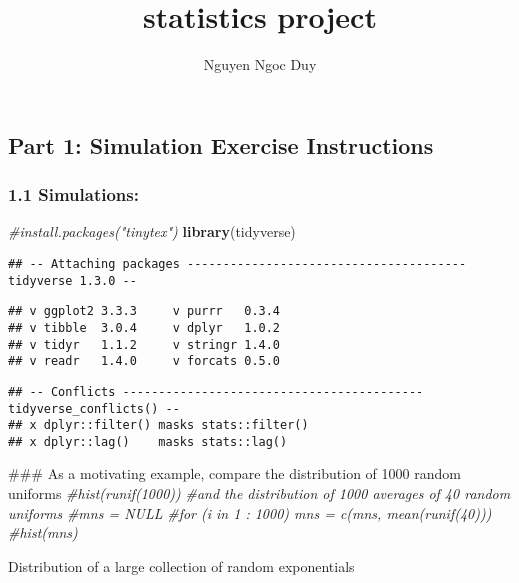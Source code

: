 \documentclass[]{article}
\title{statistics project}
\author{Nguyen Ngoc Duy}
\date{}
\newenvironment{Shaded}{\begin{snugshade}}{\end{snugshade}}
\newcommand{\KeywordTok}[1]{\textcolor[rgb]{0.13,0.29,0.53}{\textbf{#1}}}
\newcommand{\CommentTok}[1]{\textcolor[rgb]{0.56,0.35,0.01}{\textit{#1}}}
\newcommand{\NormalTok}[1]{#1}
\begin{document}
\maketitle

\subsection{Part 1: Simulation Exercise
Instructions}\label{part-1-simulation-exercise-instructions}

\subsubsection{1.1 Simulations:}\label{simulations}

\begin{Shaded}
\begin{Highlighting}[]
\CommentTok{#install.packages("tinytex")}
\KeywordTok{library}\NormalTok{(tidyverse)}
\end{Highlighting}
\end{Shaded}

\begin{verbatim}
## -- Attaching packages --------------------------------------- tidyverse 1.3.0 --
\end{verbatim}

\begin{verbatim}
## v ggplot2 3.3.3     v purrr   0.3.4
## v tibble  3.0.4     v dplyr   1.0.2
## v tidyr   1.1.2     v stringr 1.4.0
## v readr   1.4.0     v forcats 0.5.0
\end{verbatim}

\begin{verbatim}
## -- Conflicts ------------------------------------------ tidyverse_conflicts() --
## x dplyr::filter() masks stats::filter()
## x dplyr::lag()    masks stats::lag()
\end{verbatim}

\begin{Shaded}
\begin{Highlighting}[]
\NormalTok{### As a motivating example, compare the distribution of 1000 random uniforms}
\CommentTok{#hist(runif(1000))}
\CommentTok{#and the distribution of 1000 averages of 40 random uniforms}
\CommentTok{#mns = NULL}
\CommentTok{#for (i in 1 : 1000) mns = c(mns, mean(runif(40)))}
\CommentTok{#hist(mns)}
\end{Highlighting}
\end{Shaded}

Distribution of a large collection of random exponentials
\end{document}
